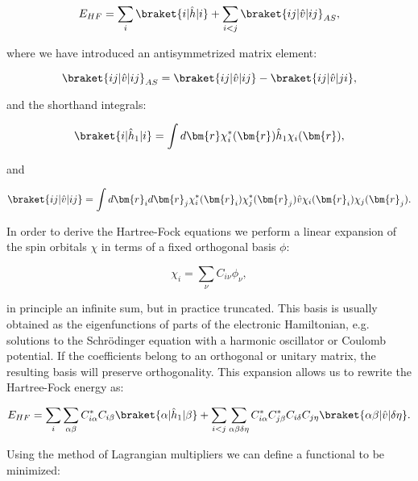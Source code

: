 \begin{equation}
 E_{HF} = \sum_i \braket{i | \hat{h} | i}
    + \sum_{i < j} \braket{ij | \hat{v} | ij}_{AS} ,
\end{equation}

where we have introduced an antisymmetrized matrix element:

\begin{equation}
 \braket{ij | \hat{v} | ij}_{AS}
    = \braket{ij | \hat{v} | ij} - \braket{ij | \hat{v} | ji} ,
\end{equation}

and the shorthand integrals:

\begin{equation}
 \braket{i | \hat{h}_1 | i} =
    \int d\bm{r} \chi_i^*(\bm{r}) \hat{h}_1 \chi_i(\bm{r}) ,
\end{equation}

and

\begin{equation}
 \braket{ij | \hat{v} | ij} =
    \int d\bm{r}_i d\bm{r}_j \chi_i^*(\bm{r}_i) \chi_j^*(\bm{r}_j)
    \hat{v} \chi_i(\bm{r}_i) \chi_j(\bm{r}_j) .
\end{equation}

In order to derive the Hartree-Fock equations
we perform a linear expansion of the spin orbitals
$\chi$ in terms of a fixed orthogonal basis $\phi$:

\begin{equation}
 \chi_i = \sum_{\nu} C_{i\nu} \phi_{\nu} ,
\end{equation}

in principle an infinite sum, but in practice truncated.
This basis is usually obtained as the eigenfunctions of
parts of the electronic Hamiltonian, e.g. solutions
to the Schr\"{o}dinger equation with a harmonic oscillator
or Coulomb potential.
If the coefficients belong to an orthogonal or unitary matrix,
the resulting basis will preserve orthogonality.
This expansion allows us to rewrite the Hartree-Fock energy as:

\begin{equation}
 E_{HF} = \sum_i \sum_{\alpha \beta}
    C_{i \alpha}^* C_{i\beta} \braket{\alpha | \hat{h}_1 | \beta}
    + \sum_{i < j} \sum_{\alpha \beta \delta \eta}
    C_{i\alpha}^* C_{j\beta}^* C_{i\delta} C_{j\eta}
    \braket{\alpha \beta | \hat{v} | \delta \eta} .
\end{equation}

Using the method of Lagrangian multipliers
we can define a functional to be minimized:

